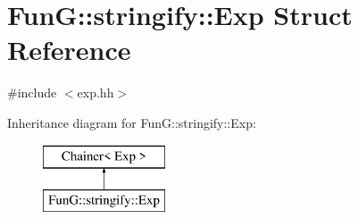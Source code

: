 \hypertarget{structFunG_1_1stringify_1_1Exp}{\section{Fun\-G\-:\-:stringify\-:\-:Exp Struct Reference}
\label{structFunG_1_1stringify_1_1Exp}
}


{\ttfamily \#include $<$exp.\-hh$>$}

Inheritance diagram for Fun\-G\-:\-:stringify\-:\-:Exp\-:\begin{figure}[H]
\begin{center}
\leavevmode
\includegraphics[height=2.000000cm]{structFunG_1_1stringify_1_1Exp}
\end{center}
\end{figure}
